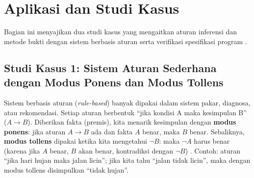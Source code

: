 \section{Aplikasi dan Studi Kasus}

Bagian ini menyajikan dua studi kasus yang mengaitkan aturan inferensi dan metode bukti dengan sistem berbasis aturan serta verifikasi spesifikasi program \cite{rosen2019,stanford_cs103,mit_6042}.

\subsection*{Studi Kasus 1: Sistem Aturan Sederhana dengan Modus Ponens dan Modus Tollens}

Sistem berbasis aturan (\emph{rule-based}) banyak dipakai dalam sistem pakar, diagnosa, atau rekomendasi. Setiap aturan berbentuk ``jika kondisi A maka kesimpulan B'' ($A \to B$). Diberikan fakta (premis), kita menarik kesimpulan dengan \textbf{modus ponens}: jika aturan $A \to B$ ada dan fakta $A$ benar, maka $B$ benar. Sebaliknya, \textbf{modus tollens} dipakai ketika kita mengetahui $\neg B$: maka $\neg A$ harus benar (karena jika $A$ benar, $B$ akan benar, kontradiksi dengan $\neg B$) \cite{rosen2019,levin_discrete}. Contoh: aturan ``jika hari hujan maka jalan licin''; jika kita tahu ``jalan tidak licin'', maka dengan modus tollens disimpulkan ``tidak hujan''.

